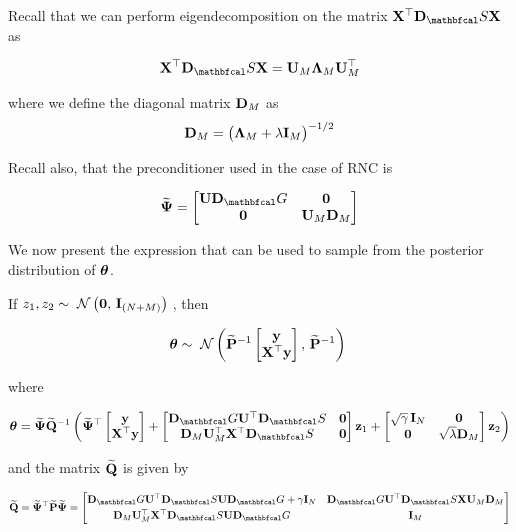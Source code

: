 Recall that we can perform eigendecomposition on the matrix $\X^\top\D_\St \X$ as 

$$
\X^\top\D_\St \X = \U_M \LAM_M \U_M^\top
$$

where we define the diagonal matrix $\mathbf{D}_M $ as
$$
\mathbf{D}_M = \big(\mathbf{\Lambda}_M + \lambda \mathbf{I}_M \big)^{-1/2}
$$

Recall also, that the preconditioner used in the case of RNC is 

$$
\widetilde{\PSI} = \begin{bmatrix}
    \U \D_\Gt & \zero \\
    \zero & \U_M \D_M 
\end{bmatrix}
$$

We now present the expression that can be used to sample from the posterior distribution of $\boldsymbol{\theta}$. 

\begin{theorem}
    If $z_1, z_2 \sim \; \mathcal{N}\left(\mathbf{0}, \, \mathbf{I}_{(N+M)}\right) \;$, then
    
    $$
    \boldsymbol{\theta} \sim \; \mathcal{N}\left(\widetilde{\mathbf{P}}^{-1} \begin{bmatrix} \mathbf{y} \\ \mathbf{X}^\top \mathbf{y} \end{bmatrix}, \, \widetilde{\mathbf{P}}^{-1}\right) \;
    $$ 
    
    where 

    \begin{equation}
        \thetaa = \widetilde{\PSI} \widetilde{\Q}^{-1} \left(\widetilde{\PSI}^\top \begin{bmatrix} \y \\ \X^\top \y \end{bmatrix} + \begin{bmatrix}
            \D_\Gt \U^\top \D_\St & \zero \\
            \D_M \U_M^\top \X^\top \D_\St & \zero
        \end{bmatrix} \z_1 + \begin{bmatrix}
            \sqrt{\gamma} \, \I_N & \zero \\
            \zero & \sqrt{\lambda} \D_M
        \end{bmatrix} \z_2 \right)
        \label{eq:PO_sample_RNC}
    \end{equation}

    and the matrix $\widetilde{\mathbf{Q}}$ is given by 

    $$
    \widetilde{\Q} = \widetilde{\PSI}^\top \widetilde{\PP} \widetilde{\PSI}  = \begin{bmatrix}
        \D_\Gt \U^\top \D_\St \U \D_\Gt + \gamma \I_{N}  &  \D_\Gt \U^\top \D_\St \X \U_M \D_M \\[0.1cm] 
        \D_M \U_M^\top \X^\top \D_\St \U \D_\Gt & \I_M
        \end{bmatrix}
    $$

\end{theorem}

